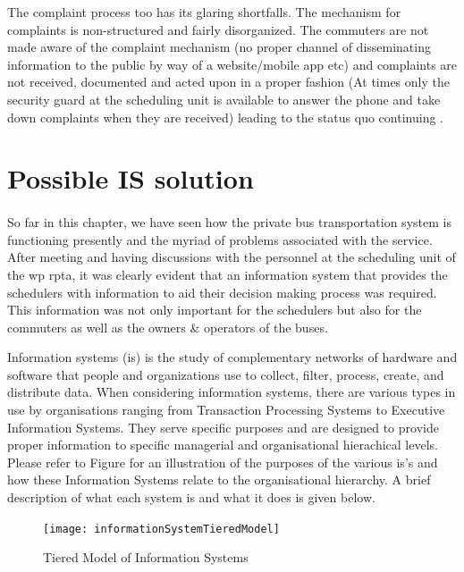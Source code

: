 The complaint process too has its glaring shortfalls. The mechanism for complaints is non-structured and fairly disorganized. The commuters are not made aware of the complaint mechanism (no proper channel of disseminating information to the public by way of a website/mobile app etc) and complaints are not received, documented and acted upon in a proper fashion (At times only the security guard at the scheduling unit is available to answer the phone and take down complaints when they are received) leading to the status quo continuing \cite{Mahesh2013a, Theja2013a, Mahesh2013b, Navaratne2013a, Navaratne2013b, Ranjith2013a}.



\section{Possible IS solution}

\paragraph{} So far in this chapter, we have seen how the private bus transportation system is functioning presently and the myriad of problems associated with the service. After meeting and having discussions with the personnel at the scheduling unit of the \acrshort{wp} \acrshort{rpta}, it was clearly evident that an information system that provides the schedulers with information to aid their decision making process was required. This information was not only important for the schedulers but also for the commuters as well as the owners \& operators of the buses. 

Information systems (\acrshort{is}) is the study of complementary networks of hardware and software that people and organizations use to collect, filter, process, create, and distribute data\cite{Denning1999}. When considering information systems, there are various types in use by organisations ranging from Transaction Processing Systems to Executive Information Systems. They serve specific purposes and are designed to provide proper information to specific managerial and organisational hierachical levels. Please refer to Figure for an illustration of the purposes of the various \acrshort{is}'s and how these Information Systems relate to the organisational hierarchy. A brief description of what each system is and what it does is given below.

\begin{figure}[h!]
\centering
\texttt{[image: informationSystemTieredModel]}
\caption[Tiered Model of Information Systems]{Tiered Model of Information Systems \cite{Laudon1988}}
\label{image-informationSystemTieredModel}
\end{figure}


